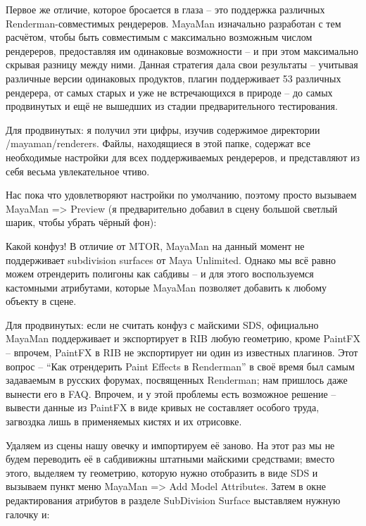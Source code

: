   

 Первое же отличие, которое бросается в глаза – это
    поддержка различных Renderman-совместимых рендереров. MayaMan
    изначально разработан с тем расчётом, чтобы быть совместимым с
    максимально возможным числом рендереров, предоставляя им одинаковые
    возможности – и при этом максимально скрывая разницу между ними.
    Данная стратегия дала свои результаты – учитывая различные версии
    одинаковых продуктов, плагин поддерживает 53 различных рендерера,
    от самых старых и уже не встречающихся в природе – до самых
    продвинутых и ещё не вышедших из стадии предварительного
    тестирования.
  

 Для
    продвинутых: я получил эти цифры,
    изучив содержимое директории /mayaman/renderers. Файлы, находящиеся
    в этой папке, содержат все необходимые настройки для всех
    поддерживаемых рендереров, и представляют из себя весьма
    увлекательное чтиво.
  

 Нас пока что удовлетворяют настройки по умолчанию,
    поэтому просто вызываем MayaMan => Preview (я предварительно
    добавил в сцену большой светлый шарик, чтобы убрать чёрный
    фон):
  

  

 Какой конфуз! В отличие от MTOR, MayaMan на данный
    момент не поддерживает subdivision surfaces от Maya Unlimited.
    Однако мы всё равно можем отрендерить полигоны как сабдивы – и для
    этого воспользуемся кастомными атрибутами, которые MayaMan
    позволяет добавить к любому объекту в сцене.
  

 Для
    продвинутых: если не считать конфуз
    с майскими SDS, официально MayaMan поддерживает и экспортирует в
    RIB любую геометрию, кроме PaintFX – впрочем, PaintFX в RIB не
    экспортирует ни один из известных плагинов. Этот вопрос – “Как
    отрендерить Paint Effects в Renderman” в своё время был самым
    задаваемым в русских форумах, посвященных Renderman; нам пришлось
    даже вынести его в FAQ. Впрочем, и у этой проблемы есть возможное
    решение – вывести данные из PaintFX в виде кривых не составляет
    особого труда, загвоздка лишь в применяемых кистях и их
    отрисовке.
  

    Удаляем из сцены нашу овечку и импортируем её заново. На этот раз
    мы не будем переводить её в сабдивижны штатными майскими
    средствами; вместо этого, выделяем ту геометрию, которую нужно
    отобразить в виде SDS и вызываем пункт меню MayaMan => Add Model
    Attributes. Затем в окне редактирования атрибутов в разделе
    SubDivision Surface выставляем нужную галочку и:
  


